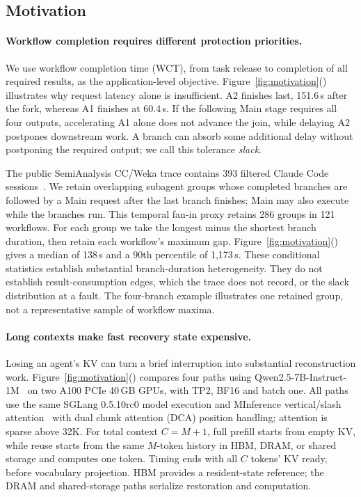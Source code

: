 \subsection{Motivation}

\paragraph{Workflow completion requires different protection priorities.}
\label{sec:motivation-workflow}
We use workflow completion time (WCT), from task release to completion of
all required results, as the application-level objective.
Figure~\ref{fig:motivation}() illustrates
why request latency alone is insufficient. A2 finishes last, 151.6\,s
after the fork, whereas A1 finishes at 60.4\,s. If the following Main stage
requires all four outputs, accelerating A1 alone does not advance the
join, while delaying A2 postpones downstream work. A branch can absorb
some additional delay without postponing the required output; we call
this tolerance \emph{slack}.

The public SemiAnalysis CC/Weka trace contains 393 filtered Claude Code
sessions~\cite{semianalysis2026cctraces}. We retain overlapping subagent
groups whose completed branches are followed by a Main request after the
last branch finishes; Main may also execute while the branches run.
This temporal fan-in proxy retains 286 groups in 121 workflows.
For each group we take the longest minus the shortest branch duration,
then retain each workflow's maximum gap.
Figure~\ref{fig:motivation}() gives a
median of 138\,s and a 90th percentile of 1,173\,s. These conditional
statistics establish substantial branch-duration heterogeneity. They do
not establish result-consumption edges, which the trace does not record,
or the slack distribution at a fault. The four-branch example illustrates
one retained group, not a representative sample of workflow maxima.

\paragraph{Long contexts make fast recovery state expensive.}
\label{sec:motivation-long-context}
Losing an agent's KV can turn a brief interruption into substantial
reconstruction work. Figure~\ref{fig:motivation}()
compares four paths using Qwen2.5-7B-Instruct-1M~\cite{qwen2025qwen25oneM}
on two A100 PCIe 40\,GB GPUs, with TP2, BF16 and batch one.
All paths use the same SGLang 0.5.10rc0 model execution and
MInference vertical/slash attention~\cite{jiang2024minference} with dual chunk
attention (DCA) position handling; attention is sparse above 32K.
For total context $C=M+1$, full prefill starts from empty KV, while reuse
starts from the same $M$-token history in HBM, DRAM, or shared storage and
computes one token. Timing ends with all $C$ tokens' KV ready, before
vocabulary projection. HBM provides a resident-state reference; the
DRAM and shared-storage paths serialize restoration and computation.

